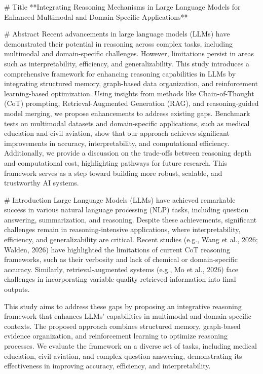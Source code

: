 # Title
**Integrating Reasoning Mechanisms in Large Language Models for Enhanced Multimodal and Domain-Specific Applications**

# Abstract
Recent advancements in large language models (LLMs) have demonstrated their potential in reasoning across complex tasks, including multimodal and domain-specific challenges. However, limitations persist in areas such as interpretability, efficiency, and generalizability. This study introduces a comprehensive framework for enhancing reasoning capabilities in LLMs by integrating structured memory, graph-based data organization, and reinforcement learning-based optimization. Using insights from methods like Chain-of-Thought (CoT) prompting, Retrieval-Augmented Generation (RAG), and reasoning-guided model merging, we propose enhancements to address existing gaps. Benchmark tests on multimodal datasets and domain-specific applications, such as medical education and civil aviation, show that our approach achieves significant improvements in accuracy, interpretability, and computational efficiency. Additionally, we provide a discussion on the trade-offs between reasoning depth and computational cost, highlighting pathways for future research. This framework serves as a step toward building more robust, scalable, and trustworthy AI systems.

# Introduction
Large Language Models (LLMs) have achieved remarkable success in various natural language processing (NLP) tasks, including question answering, summarization, and reasoning. Despite these achievements, significant challenges remain in reasoning-intensive applications, where interpretability, efficiency, and generalizability are critical. Recent studies (e.g., Wang et al., 2026; Walden, 2026) have highlighted the limitations of current CoT reasoning frameworks, such as their verbosity and lack of chemical or domain-specific accuracy. Similarly, retrieval-augmented systems (e.g., Mo et al., 2026) face challenges in incorporating variable-quality retrieved information into final outputs.

This study aims to address these gaps by proposing an integrative reasoning framework that enhances LLMs' capabilities in multimodal and domain-specific contexts. The proposed approach combines structured memory, graph-based evidence organization, and reinforcement learning to optimize reasoning processes. We evaluate the framework on a diverse set of tasks, including medical education, civil aviation, and complex question answering, demonstrating its effectiveness in improving accuracy, efficiency, and interpretability.

